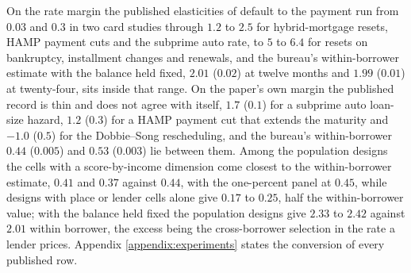 On the rate margin the published elasticities of default to the payment run from $0.03$ and $0.3$ in two card studies through $1.2$ to $2.5$ for hybrid-mortgage resets, HAMP payment cuts and the subprime auto rate, to $5$ to $6.4$ for resets on bankruptcy, installment changes and renewals, and the bureau's within-borrower estimate with the balance held fixed, $2.01$ ($0.02$) at twelve months and $1.99$ ($0.01$) at twenty-four, sits inside that range. On the paper's own margin the published record is thin and does not agree with itself, $1.7$ ($0.1$) for a subprime auto loan-size hazard, $1.2$ ($0.3$) for a HAMP payment cut that extends the maturity and $-1.0$ ($0.5$) for the Dobbie--Song rescheduling, and the bureau's within-borrower $0.44$ ($0.005$) and $0.53$ ($0.003$) lie between them. Among the population designs the cells with a score-by-income dimension come closest to the within-borrower estimate, $0.41$ and $0.37$ against $0.44$, with the one-percent panel at $0.45$, while designs with place or lender cells alone give $0.17$ to $0.25$, half the within-borrower value; with the balance held fixed the population designs give $2.33$ to $2.42$ against $2.01$ within borrower, the excess being the cross-borrower selection in the rate a lender prices. Appendix \ref{appendix:experiments} states the conversion of every published row.
